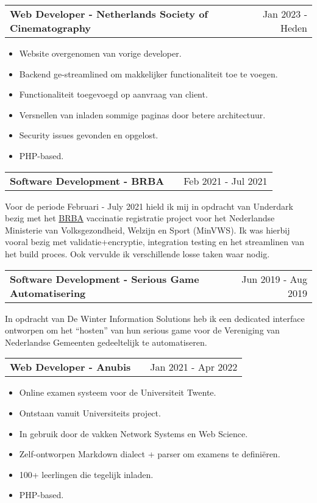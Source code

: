 \documentclass[a4paper,12pt]{article}
\makeatletter
\newenvironment{jobshort}[2]
    {
    \begin{tabularx}{\linewidth}{@{}l X r@{}}
    \textbf{#1} & \hfill &  #2 \\[3.75pt]
    \end{tabularx}
    }
    {
    }
\newenvironment{joblong}[2]
    {
    \begin{tabularx}{\linewidth}{@{}l X r@{}}
    \textbf{#1} & \hfill &  #2 \\[3.75pt]
    \end{tabularx}
    \begin{minipage}[t]{\linewidth}
    \begin{itemize}[nosep,after=\strut, leftmargin=1em, itemsep=3pt,label=--]
    }
    {
    \end{itemize}
    \end{minipage}    
    }
\makeatother
\begin{document}
\begin{joblong}{Web Developer - Netherlands Society of Cinematography}{Jan 2023 - Heden}
& \hfill \href{https://cinematography.nl}{cinematography.nl} \\[3.75]
\item Website overgenomen van vorige developer.
\item Backend ge-streamlined om makkelijker functionaliteit toe te voegen.
\item Functionaliteit toegevoegd op aanvraag van client.
\item Versnellen van inladen sommige paginas door betere architectuur.
\item Security issues gevonden en opgelost.
\item PHP-based.
\end{joblong}

\begin{jobshort}{Software Development - BRBA}{Feb 2021 - Jul 2021}
Voor de periode Februari - July 2021 hield ik mij in opdracht van Underdark bezig met het \href{https://www.ronroozendaal.nl/blog/2021/05/een-nieuw-registratiesysteem-in-een-paar-weken-tijd}{BRBA} vaccinatie registratie project voor het Nederlandse Ministerie van
Volksgezondheid, Welzijn en Sport (MinVWS). Ik was hierbij vooral bezig met validatie+encryptie, integration testing en het streamlinen van het build proces. Ook vervulde ik verschillende losse taken waar nodig.
\end{jobshort}

\begin{jobshort}{Software Development - Serious Game Automatisering}{Jun 2019 - Aug 2019}
In opdracht van De Winter Information Solutions heb ik een dedicated interface ontworpen om het ``hosten'' van hun serious game voor de Vereniging van Nederlandse Gemeenten gedeeltelijk te automatiseren. 
\end{jobshort}

\begin{joblong}{Web Developer - Anubis}{Jan 2021 - Apr 2022}
\item Online examen systeem voor de Universiteit Twente.
\item Ontstaan vanuit Universiteits project.
\item In gebruik door de vakken Network Systems en Web Science.
\item Zelf-ontworpen Markdown dialect + parser om examens te definiëren. 
\item 100+ leerlingen die tegelijk inladen.
\item PHP-based.
\end{joblong}
  
\end{document}
